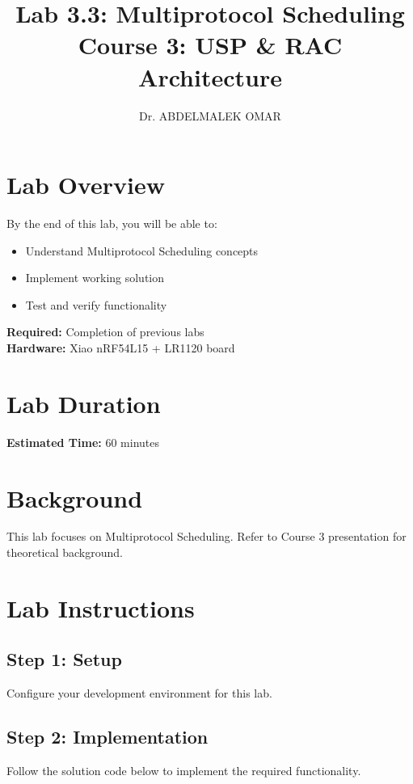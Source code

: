 \documentclass[11pt,a4paper]{article}
\title{\textbf{Lab 3.3: Multiprotocol Scheduling}\\
\large Course 3: USP & RAC Architecture}
\author{Dr. ABDELMALEK OMAR}
\date{}
\begin{document}
\maketitle
\thispagestyle{fancy}

\section{Lab Overview}

\begin{objectivebox}
By the end of this lab, you will be able to:
\begin{itemize}
    \item Understand Multiprotocol Scheduling concepts
    \item Implement working solution
    \item Test and verify functionality
\end{itemize}
\end{objectivebox}

\begin{prereqbox}
\textbf{Required:} Completion of previous labs\\
\textbf{Hardware:} Xiao nRF54L15 + LR1120 board
\end{prereqbox}

\section{Lab Duration}
\textbf{Estimated Time:} 60 minutes

\section{Background}

This lab focuses on Multiprotocol Scheduling. Refer to Course 3 presentation for theoretical background.

\section{Lab Instructions}

\subsection{Step 1: Setup}
Configure your development environment for this lab.

\subsection{Step 2: Implementation}
Follow the solution code below to implement the required functionality.
\end{document}
